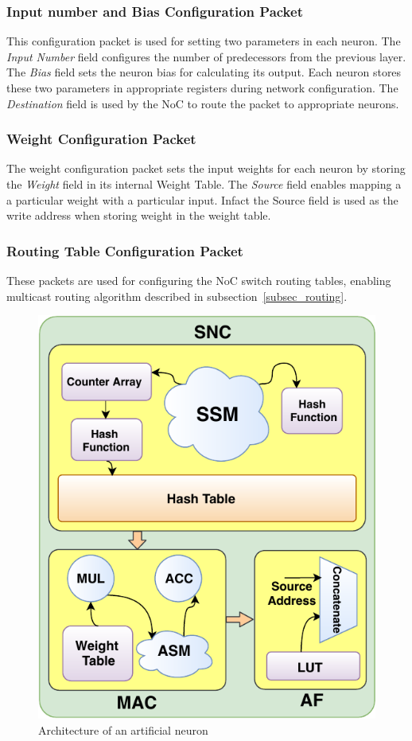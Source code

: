 \subsubsection*{\bf Input number and Bias Configuration Packet}
This configuration packet is used for setting two parameters in each neuron.
The \emph{Input Number} field configures the number of predecessors from the previous layer.
The \emph{Bias} field sets the neuron bias for calculating its output.
Each neuron stores these two parameters in appropriate registers during network configuration.
The \emph{Destination} field is used by the NoC to route the packet to appropriate neurons. 
\subsubsection*{\bf Weight Configuration Packet}
The weight configuration packet sets the input weights for each neuron by storing the \emph{Weight} field in its internal Weight Table.
The \emph{Source} field enables mapping a a particular weight with a particular input.
Infact the Source field is used as the write address when storing weight in the weight table.
\subsubsection*{\bf Routing Table Configuration Packet}
These packets are used for configuring the NoC switch routing tables, enabling multicast routing algorithm described in subsection~\ref{subsec_routing}.


\begin{figure}
    \centering
    \includegraphics[width =0.8\columnwidth]{Figures/neuron.pdf}
    \caption{Architecture of an artificial neuron}
    \label{fig:neuron}
\end{figure}

